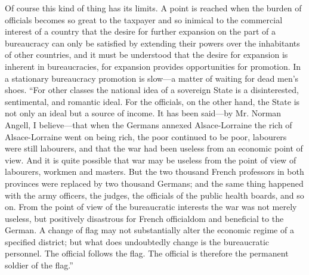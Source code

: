 \documentclass{book}
\begin{document}
Of course this kind of thing has its limits. A point is reached when the burden of officials becomes so great to the taxpayer and so inimical to the commercial interest of a country that the desire for further expansion on the part of a bureaucracy can only be satisfied by extending their powers over the inhabitants of other countries, and it must be understood that the desire for expansion is inherent in bureaucracies, for expansion provides opportunities for promotion. In a stationary bureaucracy promotion is slow—a matter of waiting for dead men’s shoes. “For other classes the national idea of a sovereign State is a disinterested, sentimental, and romantic ideal. For the officials, on the other hand, the State is not only an ideal but a source of income. It has been said—by Mr. Norman Angell, I believe—that when the Germans annexed Alsace-Lorraine the rich of Alsace-Lorraine went on being rich, the poor continued to be poor, labourers were still labourers, and that the war had been useless from an economic point of view. And it is quite possible that war may be useless from the point of view of labourers, workmen and masters. But the two thousand French professors in both provinces were replaced by two thousand Germans; and the same thing happened with the army officers, the judges, the officials of the public health boards, and so on. From the point of view of the bureaucratic interests the war was not merely useless, but positively disastrous for French officialdom and beneficial to the German. A change of flag may not substantially alter the economic regime of a specified district; but what does undoubtedly change is the bureaucratic personnel. The official follows the flag. The official is therefore the permanent soldier of the flag.”\footnotemark[3]
\end{document}
